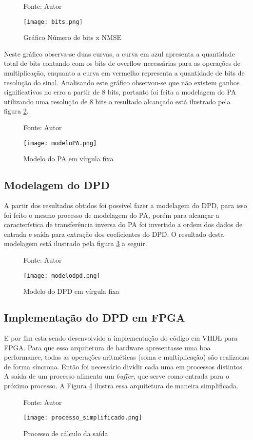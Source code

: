 \begin{figure}[H]
    \centering
    \captionsetup{justification=centering}
    \caption*{Fonte: Autor}
    \texttt{[image: bits.png]}
    \caption{Gráfico Número de bits x NMSE}
    \label{fig:bits}
\end{figure}

Neste gráfico observa-se duas curvas, a curva em azul apresenta a quantidade total de bits contando com os bits de overflow necessárias para as operações de multiplicação, enquanto a curva em vermelho representa a quantidade de bits de resolução do sinal. Analisando este gráfico observou-se que não existem ganhos significativos no erro a partir de 8 bits, portanto foi feita a modelagem do PA utilizando uma resolução de 8 bits o resultado alcançado está ilustrado pela figura \ref{fig:modelopa}.

\begin{figure}[H]
    \centering
    \captionsetup{justification=centering}
    \caption*{Fonte: Autor}
    \texttt{[image: modeloPA.png]}
    \caption{Modelo do PA em vírgula fixa}
    \label{fig:modelopa}
\end{figure}

\subsection{Modelagem do DPD}
A partir dos resultados obtidos foi possível fazer a modelagem do DPD, para isso foi feito o mesmo processo de modelagem do PA, porém para alcançar a característica de transferência inversa do PA foi invertido a ordem dos dados de entrada e saída para extração dos coeficientes do DPD. O resultado desta modelagem está ilustrado pela figura \ref{fig:modelodpd} a seguir.

\begin{figure}[H]
    \centering
    \captionsetup{justification=centering}
    \caption*{Fonte: Autor}
    \texttt{[image: modelodpd.png]}
    \caption{Modelo do DPD em vírgula fixa}
    \label{fig:modelodpd}
\end{figure}

\subsection{Implementação do DPD em FPGA}

E por fim esta sendo desenvolvido a implementação do código em VHDL para FPGA.
Para que essa arquitetura de hardware apresentasse uma boa performance, todas as operações aritméticas (soma e multiplicação) são realizadas de forma síncrona. Então foi necessário dividir cada uma em processos distintos. A saída de um processo alimenta um \textit{buffer}, que serve como entrada para o próximo processo. A Figura \ref{fig:diagramaprocesssimpl} ilustra essa arquitetura de maneira simplificada.

\begin{figure}[H]
	\centering
	\captionsetup{justification=centering}
	\caption*{Fonte: Autor}
	\texttt{[image: processo\_simplificado.png]}
	\caption{Processo de cálculo da saída}
	\label{fig:diagramaprocesssimpl}
\end{figure}
